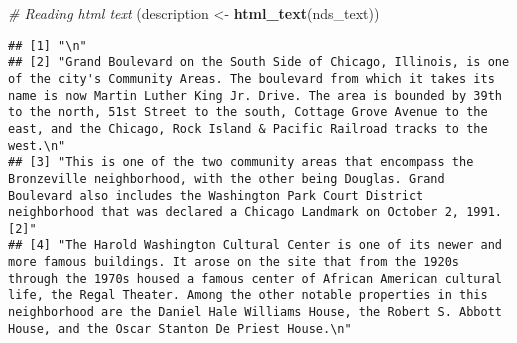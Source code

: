 \documentclass[
]{article}
\newenvironment{Shaded}{\begin{snugshade}}{\end{snugshade}}
\newcommand{\CommentTok}[1]{\textcolor[rgb]{0.56,0.35,0.01}{\textit{#1}}}
\newcommand{\FunctionTok}[1]{\textcolor[rgb]{0.13,0.29,0.53}{\textbf{#1}}}
\newcommand{\NormalTok}[1]{#1}
\newcommand{\OtherTok}[1]{\textcolor[rgb]{0.56,0.35,0.01}{#1}}
\begin{document}
\begin{Shaded}
\begin{Highlighting}[]
\CommentTok{\# Reading html text}
\NormalTok{(description }\OtherTok{\textless{}{-}} \FunctionTok{html\_text}\NormalTok{(nds\_text))}
\end{Highlighting}
\end{Shaded}

\begin{verbatim}
## [1] "\n"                                                                                                                                                                                                                                                                                                                                                                                                                                                                                                                                                 
## [2] "Grand Boulevard on the South Side of Chicago, Illinois, is one of the city's Community Areas. The boulevard from which it takes its name is now Martin Luther King Jr. Drive. The area is bounded by 39th to the north, 51st Street to the south, Cottage Grove Avenue to the east, and the Chicago, Rock Island & Pacific Railroad tracks to the west.\n"                                                                                                                                                                                          
## [3] "This is one of the two community areas that encompass the Bronzeville neighborhood, with the other being Douglas. Grand Boulevard also includes the Washington Park Court District neighborhood that was declared a Chicago Landmark on October 2, 1991.[2]"                                                                                                                                                                                                                                                                                        
## [4] "The Harold Washington Cultural Center is one of its newer and more famous buildings. It arose on the site that from the 1920s through the 1970s housed a famous center of African American cultural life, the Regal Theater. Among the other notable properties in this neighborhood are the Daniel Hale Williams House, the Robert S. Abbott House, and the Oscar Stanton De Priest House.\n"                                                                                                                                                      

\end{verbatim}
\end{document}
